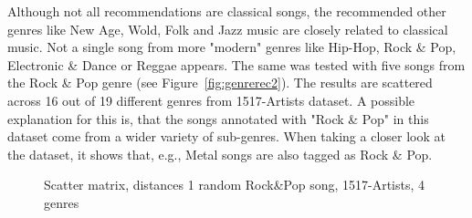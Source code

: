 \noindent Although not all recommendations are classical songs, the recommended other genres like New Age, Wold, Folk and Jazz music are closely related to classical music. Not a single song from more "modern" genres like Hip-Hop, Rock \& Pop, Electronic \& Dance or Reggae appears.
\noindent The same was tested with five songs from the Rock \& Pop genre (see Figure~\ref{fig:genrerec2}). The results are scattered across 16 out of 19 different genres from 1517-Artists dataset. A possible explanation for this is, that the songs annotated with "Rock \& Pop" in this dataset come from a wider variety of sub-genres. When taking a closer look at the dataset, it shows that, e.g., Metal songs are also tagged as Rock \& Pop.\\
\begin{figure}[htbp]
	\centering
	\caption{Scatter matrix, distances 1 random Rock\&Pop song, 1517-Artists, 4 genres}
	\label{fig:corr5}
\end{figure}
\FloatBarrier

